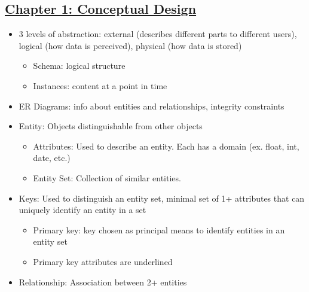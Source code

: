 \documentclass[8pt,landscape,a4paper, fleqn, dvipsnames]{extarticle}
\begin{document}
\begin{multicols*}{4}


\section*{\ul{Chapter 1: Conceptual Design}}
\begin{itemize}
    \item 3 levels of abstraction: external (describes different parts to different users), logical (how data is perceived), physical (how data is stored)
    \begin{itemize}
        \item Schema: logical structure
        \item Instances: content at a point in time
    \end{itemize}
    \item ER Diagrams: info about entities and relationships, integrity constraints
    \item Entity: Objects distinguishable from other objects
    \begin{itemize}
        \item Attributes: Used to describe an entity. Each has a domain (ex. float, int, date, etc.)
        \item Entity Set: Collection of similar entities.
    \end{itemize}
    \item Keys: Used to distinguish an entity set, minimal set of 1+ attributes that can uniquely identify an entity in a set
    \begin{itemize}
        \item Primary key: key chosen as principal means to identify entities in an entity set
        \item Primary key attributes are underlined
    \end{itemize}
    \item Relationship: Association between 2+ entities
    \begin{itemize}

\end{itemize}
\end{itemize}
\end{multicols*}
\end{document}
